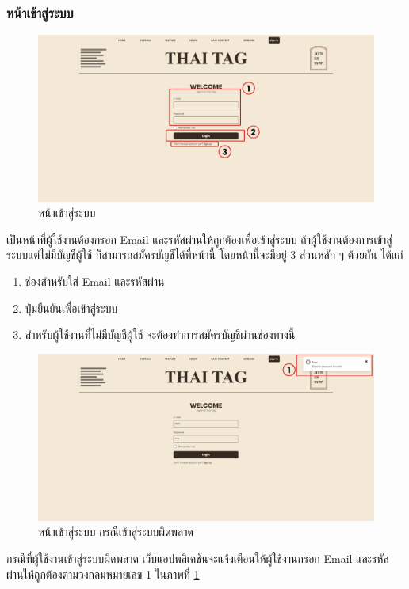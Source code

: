 \documentclass[12pt,oneside,openright,a4paper]{cpe-thai-project}
\begin{document}
        \subsubsection{หน้าเข้าสู่ระบบ}
          \begin{figure}[!ht]\centering
            \includegraphics[width=\textwidth]{./img/project_ui/4_2.png}
            \caption{หน้าเข้าสู่ระบบ}\label{fig:exp_signin}
          \end{figure}
          \hspace{1cm}เป็นหน้าที่ผู้ใช้งานต้องกรอก Email และรหัสผ่านให้ถูกต้องเพื่อเข้าสู่ระบบ ถ้าผู้ใช้งานต้องการเข้าสู่ระบบแต่ไม่มีบัญชีผู้ใช้
          ก็สามารถสมัครบัญชีได้ที่หน้านี้ โดยหน้านี้จะมีอยู่ 3 ส่วนหลัก ๆ ด้วยกัน ได้แก่
          \begin{enumerate}
            \item ช่องสำหรับใส่ Email และรหัสผ่าน
            \item ปุ่มยืนยันเพื่อเข้าสู่ระบบ
            \item สำหรับผู้ใช้งานที่ไม่มีบัญชีผู้ใช้ จะต้องทำการสมัครบัญชีผ่านช่องทางนี้
          \end{enumerate}
          \begin{figure}[!ht]\centering
            \includegraphics[width=\textwidth]{./img/project_ui/4_3.png}
            \caption{หน้าเข้าสู่ระบบ กรณีเข้าสู่ระบบผิดพลาด}\label{fig:exp_signin_wrong}
          \end{figure}
          \hspace{1cm}กรณีที่ผู้ใช้งานเข้าสู่ระบบผิดพลาด เว็บแอปพลิเคชันจะแจ้งเตือนให้ผู้ใช้งานกรอก Email และรหัสผ่านให้ถูกต้องตามวงกลมหมายเลข 1 
          ในภาพที่ \ref{fig:exp_signin}
\end{document}
